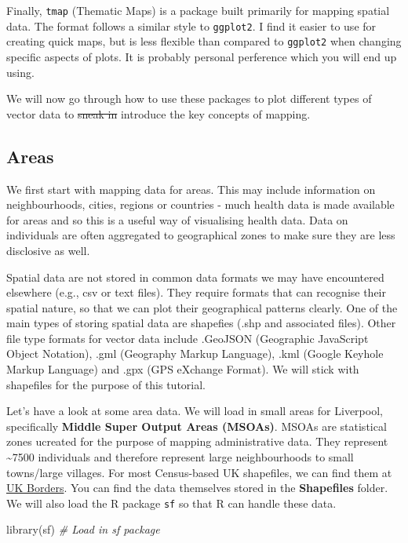 \documentclass[
]{book}
\newenvironment{Shaded}{\begin{snugshade}}{\end{snugshade}}
\newcommand{\CommentTok}[1]{\textcolor[rgb]{0.56,0.35,0.01}{\textit{#1}}}
\newcommand{\FunctionTok}[1]{\textcolor[rgb]{0.00,0.00,0.00}{#1}}
\newcommand{\NormalTok}[1]{#1}
\begin{document}
Finally, \texttt{tmap} (Thematic Maps) is a package built primarily for mapping spatial data. The format follows a similar style to \texttt{ggplot2}. I find it easier to use for creating quick maps, but is less flexible than compared to \texttt{ggplot2} when changing specific aspects of plots. It is probably personal perference which you will end up using.

We will now go through how to use these packages to plot different types of vector data to \sout{sneak in} introduce the key concepts of mapping.

\hypertarget{areas}{%
\subsection{Areas}\label{areas}}

We first start with mapping data for areas. This may include information on neighbourhoods, cities, regions or countries - much health data is made available for areas and so this is a useful way of visualising health data. Data on individuals are often aggregated to geographical zones to make sure they are less disclosive as well.

Spatial data are not stored in common data formats we may have encountered elsewhere (e.g., csv or text files). They require formats that can recognise their spatial nature, so that we can plot their geographical patterns clearly. One of the main types of storing spatial data are shapefies (.shp and associated files). Other file type formats for vector data include .GeoJSON (Geographic JavaScript Object Notation), .gml (Geography Markup Language), .kml (Google Keyhole Markup Language) and .gpx (GPS eXchange Format). We will stick with shapefiles for the purpose of this tutorial.

Let's have a look at some area data. We will load in small areas for Liverpool, specifically \textbf{Middle Super Output Areas (MSOAs)}. MSOAs are statistical zones ucreated for the purpose of mapping administrative data. They represent \textasciitilde7500 individuals and therefore represent large neighbourhoods to small towns/large villages. For most Census-based UK shapefiles, we can find them at \href{https://borders.ukdataservice.ac.uk/}{UK Borders}. You can find the data themselves stored in the \textbf{Shapefiles} folder. We will also load the R package \texttt{sf} so that R can handle these data.

\begin{Shaded}
\begin{Highlighting}[]
\FunctionTok{library}\NormalTok{(sf) }\CommentTok{\# Load in sf package}
\end{Highlighting}
\end{Shaded}
\end{document}
